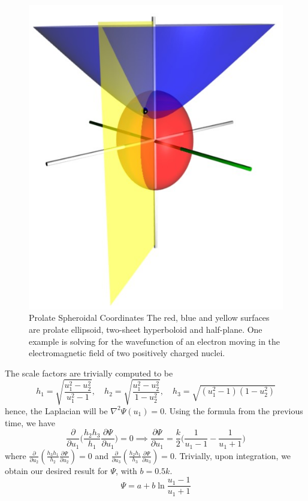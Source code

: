 \documentclass[a4paper]{article}
\begin{document}
\begin{ans}
\begin{figure}[H]
    \includegraphics[scale=0.45]{MEx1Q9.png}
    \caption{Prolate Spheroidal Coordinates The red, blue and yellow surfaces are prolate ellipsoid, two-sheet hyperboloid and half-plane. One example is solving for the wavefunction of an electron moving in the electromagnetic field of two positively charged nuclei.}
\end{figure}
The scale factors are trivially computed to be
$$h_1=\sqrt{\frac{u_1^2-u_2^2}{u_1^2-1}},\quad h_2=\sqrt{\frac{u_1^2-u_2^2}{1-u_2^2}},\quad h_3=\sqrt{(u_1^2-1)(1-u_2^2)}$$
hence, the Laplacian will be $\nabla^2\Psi(u_1)=0$. Using the formula from the previous time, we have
$$\frac{\partial}{\partial u_1}\bigg(\frac{h_2h_3}{h_1}\frac{\partial\Psi}{\partial u_1}\bigg)=0\implies\frac{\partial\Psi}{\partial u_1}=\frac{k}{2}\bigg(\frac{1}{u_1-1}-\frac{1}{u_1+1}\bigg)$$
where $\frac{\partial}{\partial u_2}(\frac{h_3h_1}{h_2}\frac{\partial\Psi}{\partial u_2})=0$ and $\frac{\partial}{\partial u_3}(\frac{h_2h_1}{h_3}\frac{\partial\Psi}{\partial u_3})=0$. Trivially, upon integration, we obtain our desired result for $\Psi$, with $b=0.5k$.
$$\Psi=a+b\ln\frac{u_1-1}{u_1+1}$$
\end{ans}
\newpage
\end{document}
